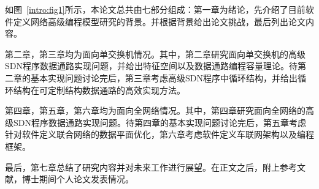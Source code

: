 如图~\ref{intro:fig1}所示，本论文总共由七部分组成：第一章为绪论，先介绍了目前软件定义网络高级编程模型研究的背景。并根据背景给出论文挑战，最后列出论文内容。

第二章，第三章均为面向单交换机情况。其中，第二章研究面向单交换机的高级SDN程序数据通路实现问题，并给出特征空间以及数据通路编程容量理论。待第二章的基本实现问题讨论完后，第三章考虑高级SDN程序中循环结构，并给出循环结构在可定制结构数据通路的高效实现方法。

第四章，第五章，第六章均为面向全网络情况。其中，第四章研究面向全网络的高级SDN程序数据通路实现问题。待第四章的基本实现问题讨论完后，第五章考虑针对软件定义联合网络的数据平面优化，第六章考虑软件定义车联网架构以及编程框架。

最后，第七章总结了研究内容并对未来工作进行展望。在正文之后，附上参考文献，博士期间个人论文发表情况。
